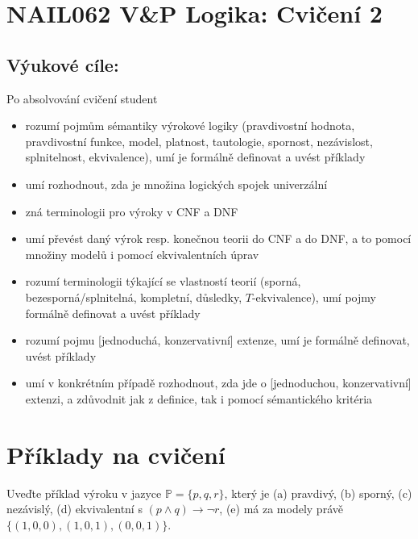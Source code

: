 \documentclass[a4paper,11pt]{amsart}
\begin{document}
\section*{NAIL062 V\&P Logika: Cvičení 2}

\subsection*{Výukové cíle:} Po absolvování cvičení student

    \begin{itemize}\setlength{\itemsep}{0pt}
        \item rozumí pojmům sémantiky výrokové logiky (pravdivostní hodnota, pravdivostní funkce, model, platnost, tautologie, spornost, nezávislost, splnitelnost, ekvivalence), umí je formálně definovat a uvést příklady
        \item umí rozhodnout, zda je množina logických spojek univerzální
        \item zná terminologii pro výroky v CNF a DNF %
        \item umí převést daný výrok resp. konečnou teorii do CNF a do DNF, a to pomocí množiny modelů i pomocí ekvivalentních úprav
        \item rozumí terminologii týkající se vlastností teorií (sporná, bezesporná/splnitelná, kompletní, důsledky, $T$-ekvivalence), umí pojmy formálně definovat a uvést příklady
        \item rozumí pojmu [jednoduchá, konzervativní] extenze, umí je formálně definovat, uvést příklady
        \item umí v konkrétním případě rozhodnout, zda jde o [jednoduchou, konzervativní] extenzi, a zdůvodnit jak z definice, tak i pomocí sémantického kritéria
    \end{itemize}


\section*{Příklady na cvičení}


\begin{problem}

    Uveďte příklad výroku v jazyce $\mathbb P=\{p,q,r\}$, který je (a) pravdivý, (b) sporný, (c) nezávislý, (d) ekvivalentní s $(p\wedge q)\to\neg r$, (e) má za modely právě $\{(1,0,0),(1,0,1),(0,0,1)\}$.


    \begin{solution}
            
    \end{solution}

\end{problem}
\end{document}
